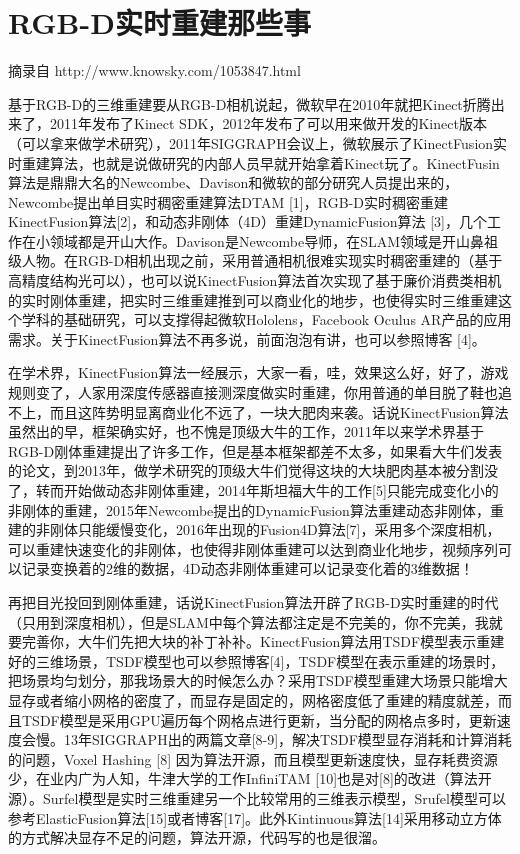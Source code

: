 
\chapter{RGB-D实时重建那些事}

摘录自 http://www.knowsky.com/1053847.html



基于RGB-D的三维重建要从RGB-D相机说起，微软早在2010年就把Kinect折腾出来了，2011年发布了Kinect SDK，2012年发布了可以用来做开发的Kinect版本（可以拿来做学术研究），2011年SIGGRAPH会议上，微软展示了KinectFusion实时重建算法，也就是说做研究的内部人员早就开始拿着Kinect玩了。KinectFusin算法是鼎鼎大名的Newcombe、Davison和微软的部分研究人员提出来的，Newcombe提出单目实时稠密重建算法DTAM [1]，RGB-D实时稠密重建KinectFusion算法[2]，和动态非刚体（4D）重建DynamicFusion算法 [3]，几个工作在小领域都是开山大作。Davison是Newcombe导师，在SLAM领域是开山鼻祖级人物。在RGB-D相机出现之前，采用普通相机很难实现实时稠密重建的（基于高精度结构光可以），也可以说KinectFusion算法首次实现了基于廉价消费类相机的实时刚体重建，把实时三维重建推到可以商业化的地步，也使得实时三维重建这个学科的基础研究，可以支撑得起微软Hololens，Facebook Oculus AR产品的应用需求。关于KinectFusion算法不再多说，前面泡泡有讲，也可以参照博客 [4]。

在学术界，KinectFusion算法一经展示，大家一看，哇，效果这么好，好了，游戏规则变了，人家用深度传感器直接测深度做实时重建，你用普通的单目脱了鞋也追不上，而且这阵势明显离商业化不远了，一块大肥肉来袭。话说KinectFusion算法虽然出的早，框架确实好，也不愧是顶级大牛的工作，2011年以来学术界基于RGB-D刚体重建提出了许多工作，但是基本框架都差不太多，如果看大牛们发表的论文，到2013年，做学术研究的顶级大牛们觉得这块的大块肥肉基本被分割没了，转而开始做动态非刚体重建，2014年斯坦福大牛的工作[5]只能完成变化小的非刚体的重建，2015年Newcombe提出的DynamicFusion算法重建动态非刚体，重建的非刚体只能缓慢变化，2016年出现的Fusion4D算法[7]，采用多个深度相机，可以重建快速变化的非刚体，也使得非刚体重建可以达到商业化地步，视频序列可以记录变换着的2维的数据，4D动态非刚体重建可以记录变化着的3维数据！

再把目光投回到刚体重建，话说KinectFusion算法开辟了RGB-D实时重建的时代（只用到深度相机），但是SLAM中每个算法都注定是不完美的，你不完美，我就要完善你，大牛们先把大块的补丁补补。KinectFusion算法用TSDF模型表示重建好的三维场景，TSDF模型也可以参照博客[4]，TSDF模型在表示重建的场景时，把场景均匀划分，那我场景大的时候怎么办？采用TSDF模型重建大场景只能增大显存或者缩小网格的密度了，而显存是固定的，网格密度低了重建的精度就差，而且TSDF模型是采用GPU遍历每个网格点进行更新，当分配的网格点多时，更新速度会慢。13年SIGGRAPH出的两篇文章[8-9]，解决TSDF模型显存消耗和计算消耗的问题，Voxel Hashing [8] 因为算法开源，而且模型更新速度快，显存耗费资源少，在业内广为人知，牛津大学的工作InfiniTAM [10]也是对[8]的改进（算法开源）。Surfel模型是实时三维重建另一个比较常用的三维表示模型，Srufel模型可以参考ElasticFusion算法[15]或者博客[17]。此外Kintinuous算法[14]采用移动立方体的方式解决显存不足的问题，算法开源，代码写的也是很溜。

